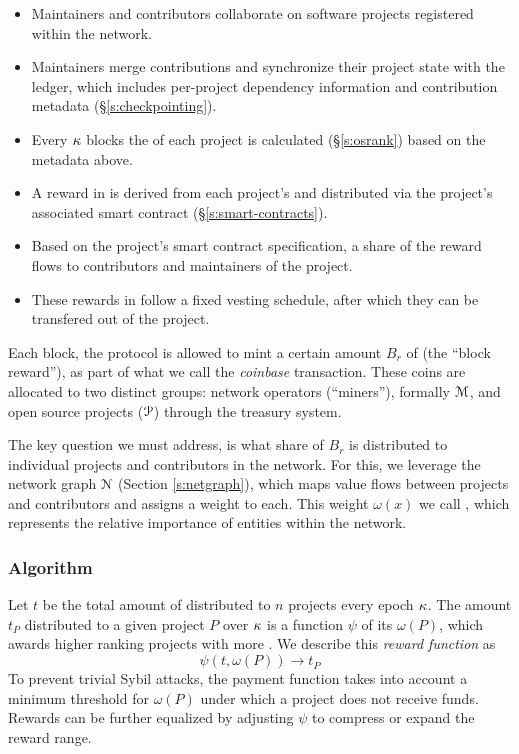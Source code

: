\begin{itemize}
    \item Maintainers and contributors collaborate on software projects
        registered within the network.
    \item Maintainers merge contributions and synchronize their project state
        with the ledger, which includes per-project dependency information and
        contribution metadata (\S\ref{s:checkpointing}).
    \item Every $\kappa$ blocks the \osrank{} of each project is calculated
        (\S\ref{s:osrank}) based on the metadata above.
    \item A reward in \oscoin{} is derived from each project's \osrank{}
        and distributed via the project's associated smart contract (\S\ref{s:smart-contracts}).
    \item Based on the project's smart contract specification, a share of the reward flows
        to contributors and maintainers of the project.
    \item These rewards in \oscoin{} follow a fixed vesting schedule, after which
        they can be transfered out of the project.
\end{itemize}

\medskip

\noindent Each block, the protocol is allowed to mint a certain amount $B_r$ of \oscoin{}
(the ``block reward''), as part of what we call the \emph{coinbase}
transaction. These coins are allocated to two distinct groups: network
operators (``miners''), formally $\mathcal{M}$, and open source projects ($\mathcal{P}$)
through the treasury system.

The key question we must address, is what share of $B_r$ is distributed to
individual projects and contributors in the network.
For this, we leverage the \oscoin{} network graph $\mathcal{N}$ (Section
\ref{s:netgraph}), which maps value flows between projects and contributors
and assigns a weight to each. This weight $\omega(x)$ we call \osrank{}, which represents
the relative importance of entities within the network.

\subsubsection{Algorithm} Let $t$ be the total amount of \oscoin{} distributed
to $n$ projects every epoch $\kappa$. The amount $t_P$ distributed to a given
project $P$ over $\kappa$ is a function $\psi$ of its \osrank{} $\omega(P)$,
which awards higher ranking projects with more \oscoin{}. We describe this
\emph{reward function} as
\[
    \psi(t, \omega(P)) \to t_P
\]
To prevent trivial Sybil attacks, the payment function takes
into account a minimum threshold for $\omega(P)$ under which a project does not
receive funds. Rewards can be further equalized by adjusting $\psi$ to
compress or expand the reward range.

